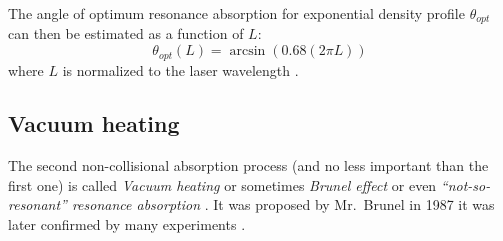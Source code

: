 The angle of optimum resonance absorption for exponential density profile $\theta_{opt}$ can then be estimated as a function of $L$:
\begin{equation}
	\theta_{opt}\left(L\right) = \arcsin\left(0.68(2\pi L)\right)
\end{equation}
where $L$ is normalized to the laser wavelength \cite{absorption1}.


\subsection*{Vacuum heating}
The second non-collisional absorption process (and no less important than the first one) is called \textit{Vacuum heating} or sometimes \textit{Brunel effect} or even \textit{“not-so-resonant” resonance absorption} \cite{brunel1987}. It was proposed by Mr.~Brunel in 1987 it was later confirmed by many experiments \cite{absorption2}.

